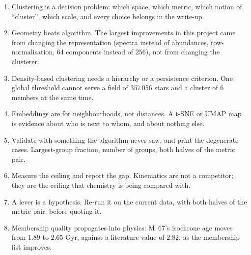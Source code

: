 \begin{summary}
\begin{enumerate}
\item Clustering is a decision problem: which space, which metric, which notion
of ``cluster'', which scale, and every choice belongs in the write-up.
\item Geometry beats algorithm. The largest improvements in this project came
  from changing the representation (spectra instead of abundances,
  row-normalisation, 64 components instead of 256), not from changing the
  clusterer.
\item Density-based clustering needs a hierarchy or a persistence criterion.
  One global threshold cannot serve a field of 357\,056 stars and a cluster of
  6 members at the same time.
\item Embeddings are for neighbourhoods, not distances. A t-SNE or UMAP map is
  evidence about who is next to whom, and about nothing else.
\item Validate with something the algorithm never saw, and print the
  degenerate cases. Largest-group fraction, number of groups, both halves of
  the metric pair.
\item Measure the ceiling and report the gap. Kinematics are not a competitor;
  they are the ceiling that chemistry is being compared with.
\item A lever is a hypothesis. Re-run it on the current data, with both
  halves of the metric pair, before quoting it.
\item Membership quality propagates into physics: M~67's isochrone age moves
  from $1.89$ to $2.65$ Gyr, against a literature value of $2.82$, as the
  membership list improves.
\end{enumerate}
\end{summary}

